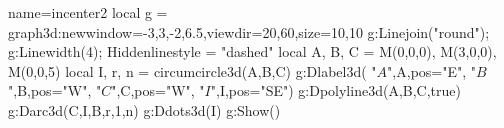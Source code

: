 \documentclass[border=5pt]{standalone}
\begin{document}
\begin{luadraw}{name=incenter2}
local g = graph3d:new{window={-3,3,-2,6.5},viewdir={20,60},size={10,10}}
g:Linejoin("round"); g:Linewidth(4); Hiddenlinestyle = "dashed"
local A, B, C = M(0,0,0), M(3,0,0), M(0,0,5)
local I, r, n = circumcircle3d(A,B,C)
g:Dlabel3d( "$A$",A,{pos="E"}, "$B$",B,{pos="W"}, "$C$",C,{pos="W"}, "$I$",I,{pos="SE"})
g:Dpolyline3d({A,B,C},true)
g:Darc3d(C,I,B,r,1,n)
g:Ddots3d(I)
g:Show()
\end{luadraw}
\end{document}
